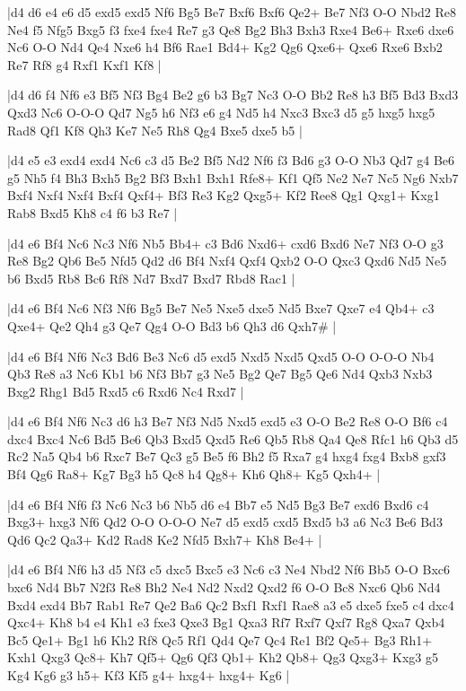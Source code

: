 \whitename{}
\blackname{}
\makegametitle
|d4 d6 e4 e6 d5 exd5 exd5 Nf6 Bg5 Be7 Bxf6 Bxf6 Qe2+ Be7 Nf3 O-O Nbd2 Re8 Ne4 f5 Nfg5 Bxg5 f3 fxe4 fxe4 Re7 g3 Qe8 Bg2 Bh3 Bxh3 Rxe4 Be6+ Rxe6 dxe6 Nc6 O-O Nd4 Qe4 Nxe6 h4 Bf6 Rae1 Bd4+ Kg2 Qg6 Qxe6+ Qxe6 Rxe6 Bxb2 Re7 Rf8 g4 Rxf1 Kxf1 Kf8  |

\whitename{}
\blackname{}
\makegametitle
|d4 d6 f4 Nf6 e3 Bf5 Nf3 Bg4 Be2 g6 b3 Bg7 Nc3 O-O Bb2 Re8 h3 Bf5 Bd3 Bxd3 Qxd3 Nc6 O-O-O Qd7 Ng5 h6 Nf3 e6 g4 Nd5 h4 Nxc3 Bxc3 d5 g5 hxg5 hxg5 Rad8 Qf1 Kf8 Qh3 Ke7 Ne5 Rh8 Qg4 Bxe5 dxe5 b5  |

\whitename{}
\blackname{}
\makegametitle
|d4 e5 e3 exd4 exd4 Nc6 c3 d5 Be2 Bf5 Nd2 Nf6 f3 Bd6 g3 O-O Nb3 Qd7 g4 Be6 g5 Nh5 f4 Bh3 Bxh5 Bg2 Bf3 Bxh1 Bxh1 Rfe8+ Kf1 Qf5 Ne2 Ne7 Nc5 Ng6 Nxb7 Bxf4 Nxf4 Nxf4 Bxf4 Qxf4+ Bf3 Re3 Kg2 Qxg5+ Kf2 Ree8 Qg1 Qxg1+ Kxg1 Rab8 Bxd5 Kh8 c4 f6 b3 Re7  |

\whitename{}
\blackname{}
\makegametitle
|d4 e6 Bf4 Nc6 Nc3 Nf6 Nb5 Bb4+ c3 Bd6 Nxd6+ cxd6 Bxd6 Ne7 Nf3 O-O g3 Re8 Bg2 Qb6 Be5 Nfd5 Qd2 d6 Bf4 Nxf4 Qxf4 Qxb2 O-O Qxc3 Qxd6 Nd5 Ne5 b6 Bxd5 Rb8 Bc6 Rf8 Nd7 Bxd7 Bxd7 Rbd8 Rac1  |

\whitename{}
\blackname{}
\makegametitle
|d4 e6 Bf4 Nc6 Nf3 Nf6 Bg5 Be7 Ne5 Nxe5 dxe5 Nd5 Bxe7 Qxe7 e4 Qb4+ c3 Qxe4+ Qe2 Qh4 g3 Qe7 Qg4 O-O Bd3 b6 Qh3 d6 Qxh7\#  |

\whitename{}
\blackname{}
\makegametitle
|d4 e6 Bf4 Nf6 Nc3 Bd6 Be3 Nc6 d5 exd5 Nxd5 Nxd5 Qxd5 O-O O-O-O Nb4 Qb3 Re8 a3 Nc6 Kb1 b6 Nf3 Bb7 g3 Ne5 Bg2 Qe7 Bg5 Qe6 Nd4 Qxb3 Nxb3 Bxg2 Rhg1 Bd5 Rxd5 c6 Rxd6 Nc4 Rxd7  |

\whitename{}
\blackname{}
\makegametitle
|d4 e6 Bf4 Nf6 Nc3 d6 h3 Be7 Nf3 Nd5 Nxd5 exd5 e3 O-O Be2 Re8 O-O Bf6 c4 dxc4 Bxc4 Nc6 Bd5 Be6 Qb3 Bxd5 Qxd5 Re6 Qb5 Rb8 Qa4 Qe8 Rfc1 h6 Qb3 d5 Rc2 Na5 Qb4 b6 Rxc7 Be7 Qc3 g5 Be5 f6 Bh2 f5 Rxa7 g4 hxg4 fxg4 Bxb8 gxf3 Bf4 Qg6 Ra8+ Kg7 Bg3 h5 Qc8 h4 Qg8+ Kh6 Qh8+ Kg5 Qxh4+  |

\whitename{}
\blackname{}
\makegametitle
|d4 e6 Bf4 Nf6 f3 Nc6 Nc3 b6 Nb5 d6 e4 Bb7 e5 Nd5 Bg3 Be7 exd6 Bxd6 c4 Bxg3+ hxg3 Nf6 Qd2 O-O O-O-O Ne7 d5 exd5 cxd5 Bxd5 b3 a6 Nc3 Be6 Bd3 Qd6 Qc2 Qa3+ Kd2 Rad8 Ke2 Nfd5 Bxh7+ Kh8 Be4+  |

\whitename{}
\blackname{}
\makegametitle
|d4 e6 Bf4 Nf6 h3 d5 Nf3 c5 dxc5 Bxc5 e3 Nc6 c3 Ne4 Nbd2 Nf6 Bb5 O-O Bxc6 bxc6 Nd4 Bb7 N2f3 Re8 Bh2 Ne4 Nd2 Nxd2 Qxd2 f6 O-O Bc8 Nxc6 Qb6 Nd4 Bxd4 exd4 Bb7 Rab1 Re7 Qe2 Ba6 Qc2 Bxf1 Rxf1 Rae8 a3 e5 dxe5 fxe5 c4 dxc4 Qxc4+ Kh8 b4 e4 Kh1 e3 fxe3 Qxe3 Bg1 Qxa3 Rf7 Rxf7 Qxf7 Rg8 Qxa7 Qxb4 Bc5 Qe1+ Bg1 h6 Kh2 Rf8 Qc5 Rf1 Qd4 Qe7 Qc4 Re1 Bf2 Qe5+ Bg3 Rh1+ Kxh1 Qxg3 Qc8+ Kh7 Qf5+ Qg6 Qf3 Qb1+ Kh2 Qb8+ Qg3 Qxg3+ Kxg3 g5 Kg4 Kg6 g3 h5+ Kf3 Kf5 g4+ hxg4+ hxg4+ Kg6  |

